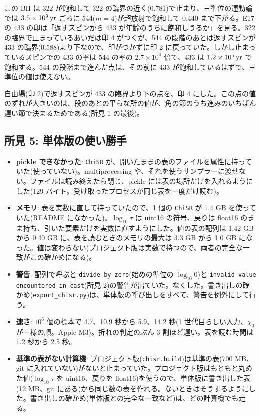 この BH は 322 が飽和して 322 の臨界の近く(0.781)で止まり、三準位の運動論では $3.5\times10^{9}\,\mathrm{yr}$ ごろに 544($m=4$)が超放射で飽和して 0.440 まで下がる。E17 の 433 の印は「返すスピンから 433 が年齢のうちに飽和しうるか」を見る。322 の臨界で止まっているあいだは印 4 がつくが、544 の段階のあとは返すスピンが 433 の臨界(0.588)より下なので、印がつかずに印 2 に戻っていた。しかし止まっているスピンでの 433 の率は 544 の率の $2.7\times10^{4}$ 倍で、433 は $1.2\times10^{5}\,\mathrm{yr}$ で飽和する。544 の段階まで進んだ点は、その前に 433 が飽和しているはずで、三準位の値は使えない。

自由場(印 2)で返すスピンが 433 の臨界より下の点を、印 4 にした。この点の値のずれが大きいのは、段のあとの平らな所の値が、角の節のうち進みのいちばん遅い節で決まるためである(所見 1 の最後)。

\subsection{所見 5: 単体版の使い勝手}

\begin{itemize}
\item \textbf{pickle できなかった}: \texttt{ChiSR} が、開いたままの表のファイルを属性に持っていた(使っていない)。multiprocessing や、それを使うサンプラーに渡せない。ファイルは読み終えたら閉じ、pickle には表の場所だけを入れるようにした(129 バイト。受け取ったプロセスが同じ表を一度だけ読む)。
\item \textbf{メモリ}: 表を実数に直して持っていたので、1 個の \texttt{ChiSR} が 1.4 GB を使っていた(README になかった)。$\log_{10}\tau$ は uint16 の符号、戻りは float16 のまま持ち、引いた要素だけを実数に直すようにした。値の表の配列は 1.42 GB から 0.40 GB に、表を読むときのメモリの最大は 3.3 GB から 1.0 GB になった。値は変わらない(プロジェクト版は実数で持つので、両者の完全な一致がこの確かめになる)。
\item \textbf{警告}: 配列で呼ぶと \texttt{divide by zero}(始めの準位の $\log_{10}0$)と \texttt{invalid value encountered in cast}(所見 2)の警告が出ていた。なくした。書き出しの確かめ(\texttt{export\_chisr.py})は、単体版の呼び出しをすべて、警告を例外にして行う。
\item \textbf{速さ}: $10^6$ 個の標本で 4.7、10.9 秒から 5.9、14.2 秒(1 世代目らしい入力、$\chi_0$ が一様の順。Apple M3)。折れの判定のぶん 3 割ほど遅い。表を読む時間は 1.2 秒から 2.5 秒。
\item \textbf{基準の表がない計算機}: プロジェクト版(\texttt{chisr.build})は基準の表(700 MB、git に入れていない)がないと止まっていた。プロジェクト版はもともと丸めた値($\log_{10}\tau$ を uint16、戻りを float16)を使うので、単体版に書き出した表(12 MB、git にある)から同じ数の表を作れる。ないときはそうするようにした。書き出しの確かめ(単体版との完全な一致など)は、どの計算機でも走る。
\end{itemize}

